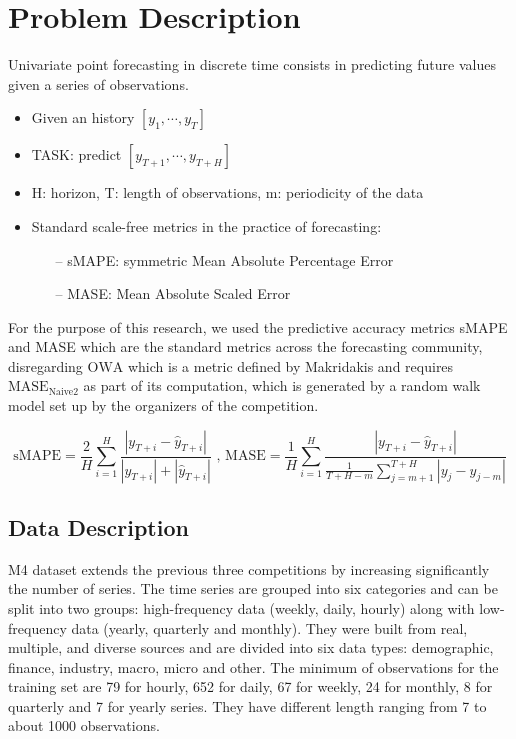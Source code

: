 \documentclass{article}
\begin{document}
\section{Problem Description}
\label{problemdescription}
Univariate point forecasting in discrete time consists in predicting future values given a series of observations.

\begin{itemize}
	\item Given an history $[ y_1, \cdots, y_T ]$
	\item TASK: predict $[y_{T+1}, \cdots , y_{T+H} ]$
	\item H: horizon, T: length of observations, m: periodicity of the data
	\item Standard scale-free metrics in the practice of forecasting:
	\begin{itemize}
			\item [--]  sMAPE: symmetric Mean Absolute Percentage Error
			\item [--]  MASE: Mean Absolute Scaled Error
	\end{itemize}
\end{itemize}

For the purpose of this research, we used the predictive accuracy metrics sMAPE and MASE which are the standard metrics across the forecasting community, 
disregarding $\text{OWA}$ which is a metric defined by Makridakis and requires $\text{MASE}_{\text{Naive2}}$  as part of its computation, which is generated by a random walk model set up by the organizers of the competition.

\[
	\text{sMAPE} = \frac{2}{H}  \sum_{i=1}^{H} \frac{ | y_{T+i}  - \hat{y}_{T+i} | } { | y_{T+i} | + | \hat{y}_{T+i} | } \text{ ,     } 
	\text{MASE} = \frac{1}{H}  \sum_{i=1}^{H} \frac{ | y_{T+i}  - \hat{y}_{T+i} | } { \frac{1} {T + H - m} \sum_{j=m+1}^{T+H}  | y_j  - y_{j-m} | }
\]



\subsection{Data Description}
\label{datadescription}

M4 dataset extends the previous three competitions by increasing significantly the number of series. The time series are grouped into six categories and can be split into two groups: 
high-frequency data (weekly, daily, hourly) along with low-frequency data (yearly, quarterly and monthly).  They were built from real, multiple, and diverse sources and are divided into six data types:
demographic, finance, industry, macro, micro and other. The minimum of observations for the training set are 79 for hourly, 652 for daily, 67 for weekly, 24 for monthly, 8 for quarterly and 7 for yearly series.
They have different length ranging from 7 to about 1000 observations.
\end{document}
